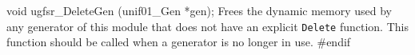 void ugfsr_DeleteGen (unif01_Gen *gen);
\endcode
 \tab  Frees the dynamic memory used by any generator of this module
  that does not have an explicit {\tt Delete} function. 
  This function should be called when a generator
  is no longer in use.
 \endtab
\code
\hide
#endif
\endhide
\endcode


\iffalse  %
\bigskip
\hrule
\bigskip
{
For other GFSR generators, see also

\begin{itemize}
\item {\tt uwu\_CreatePentaWuC}     %
\end{itemize}
}
\fi  %
